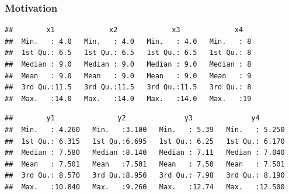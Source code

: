 \documentclass[12pt]{beamer}\usepackage[]{graphicx}\usepackage[]{color}
\makeatletter
\newenvironment{kframe}{%
 \def\at@end@of@kframe{}%
 \ifinner\ifhmode%
  \def\at@end@of@kframe{\end{minipage}}%
  \begin{minipage}{\columnwidth}%
 \fi\fi%
 \def\FrameCommand##1{\hskip\@totalleftmargin \hskip-\fboxsep
 \colorbox{shadecolor}{##1}\hskip-\fboxsep
     \hskip-\linewidth \hskip-\@totalleftmargin \hskip\columnwidth}%
 \MakeFramed {\advance\hsize-\width
   \@totalleftmargin\z@ \linewidth\hsize
   \@setminipage}}%
 {\par\unskip\endMakeFramed%
 \at@end@of@kframe}
\newenvironment{knitrout}{}{} %
\makeatother
\begin{document}
\begin{frame}[fragile]
\frametitle{Motivation}

\begin{knitrout}\scriptsize
{}\color{fgcolor}\begin{kframe}
\begin{verbatim}
##        x1             x2             x3             x4    
##  Min.   : 4.0   Min.   : 4.0   Min.   : 4.0   Min.   : 8  
##  1st Qu.: 6.5   1st Qu.: 6.5   1st Qu.: 6.5   1st Qu.: 8  
##  Median : 9.0   Median : 9.0   Median : 9.0   Median : 8  
##  Mean   : 9.0   Mean   : 9.0   Mean   : 9.0   Mean   : 9  
##  3rd Qu.:11.5   3rd Qu.:11.5   3rd Qu.:11.5   3rd Qu.: 8  
##  Max.   :14.0   Max.   :14.0   Max.   :14.0   Max.   :19
\end{verbatim}
\end{kframe}
\end{knitrout}

\begin{knitrout}\scriptsize
{}\color{fgcolor}\begin{kframe}
\begin{verbatim}
##        y1               y2              y3              y4        
##  Min.   : 4.260   Min.   :3.100   Min.   : 5.39   Min.   : 5.250  
##  1st Qu.: 6.315   1st Qu.:6.695   1st Qu.: 6.25   1st Qu.: 6.170  
##  Median : 7.580   Median :8.140   Median : 7.11   Median : 7.040  
##  Mean   : 7.501   Mean   :7.501   Mean   : 7.50   Mean   : 7.501  
##  3rd Qu.: 8.570   3rd Qu.:8.950   3rd Qu.: 7.98   3rd Qu.: 8.190  
##  Max.   :10.840   Max.   :9.260   Max.   :12.74   Max.   :12.500
\end{verbatim}
\end{kframe}
\end{knitrout}

\end{frame}


\begin{frame}
\begin{center}
\large{}
\end{center}
\end{frame}

\end{document}
